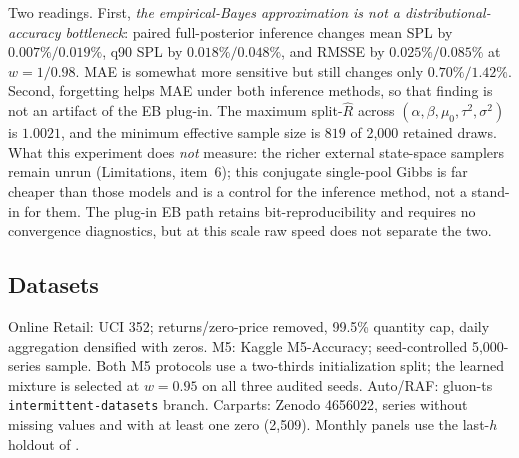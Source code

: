 \documentclass[twoside]{article}
\theoremstyle{definition}
\begin{document}
Two readings. First, \emph{the empirical-Bayes approximation is not a
distributional-accuracy bottleneck}: paired full-posterior inference changes
mean SPL by $0.007\%/0.019\%$, q90 SPL by $0.018\%/0.048\%$, and RMSSE by
$0.025\%/0.085\%$ at $w=1/0.98$. MAE is somewhat more sensitive but still
changes only $0.70\%/1.42\%$. Second, forgetting helps MAE under both
inference methods, so that finding is not an artifact of the EB plug-in.
The maximum split-$\widehat R$ across $(\alpha,\beta,\mu_0,\tau^2,\sigma^2)$
is $1.0021$, and the minimum effective sample size is $819$ of 2{,}000
retained draws.
What this experiment does \emph{not} measure: the richer external
state-space samplers
\citep{chapados2014,seeger2016} remain unrun (Limitations, item~6); this
conjugate single-pool Gibbs is far cheaper than those models and is a
control for the inference method, not a stand-in for them. The plug-in
EB path retains bit-reproducibility and requires no convergence
diagnostics, but at this scale raw speed does not separate the two.

\subsection{Datasets}\label{app:datasets}
Online Retail: UCI 352; returns/zero-price removed, 99.5\% quantity cap,
daily aggregation densified with zeros. M5: Kaggle M5-Accuracy;
seed-controlled 5{,}000-series sample. Both M5 protocols use a two-thirds
initialization split; the learned mixture is selected at $w=0.95$ on all
three audited seeds. Auto/RAF: gluon-ts
\texttt{intermittent-datasets} branch. Carparts: Zenodo 4656022, series
without missing values and with at least one zero (2{,}509). Monthly
panels use the last-$h$ holdout of \citet{damato2025}.
\end{document}
